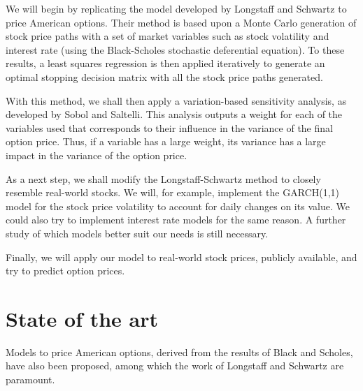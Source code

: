\documentclass[a4paper,prd,twocolumn,nofootinbib,superscriptaddress,floatfix]{revtex4}
\begin{document}
We will begin by replicating the model developed by Longstaff and Schwartz to price American options. Their method is based upon a Monte Carlo generation of stock price paths with a set of market variables such as stock volatility and interest rate (using the Black-Scholes stochastic deferential equation). To these results, a least squares regression is then applied iteratively to generate an optimal stopping decision matrix with all the stock price paths generated.

With this method, we shall then apply a variation-based sensitivity analysis, as developed by Sobol and Saltelli. This analysis outputs a weight for each of the variables used that corresponds to their influence in the variance of the final option price.
Thus, if a variable has a large weight, its variance has a large impact in the variance of the option price.

As a next step, we shall modify the Longstaff-Schwartz method to closely resemble real-world stocks. We will, for example, implement the GARCH(1,1) model for the stock price volatility to account for daily changes on its value. We could also try to implement interest rate models for the same reason.
A further study of which models better suit our needs is still necessary.

Finally, we will apply our model to real-world stock prices, publicly available, and try to predict option prices.

\section{State of the art}


Models to price American options, derived from the results of Black and Scholes, have also been proposed, among which the work of Longstaff and Schwartz are paramount.
\end{document}
